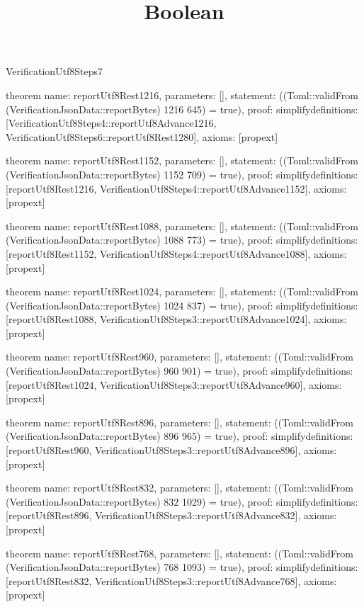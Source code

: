 \begin{lexlean}{VerificationUtf8Steps7}
\title{Boolean}
\begin{semanticmodule}

theorem{
  name: reportUtf8Rest1216,
  parameters: [],
  statement: ((Toml::validFrom (VerificationJsonData::reportBytes) 1216 645) = true),
  proof: simplify{definitions: [VerificationUtf8Steps4::reportUtf8Advance1216, VerificationUtf8Steps6::reportUtf8Rest1280]},
  axioms: [propext]
}

theorem{
  name: reportUtf8Rest1152,
  parameters: [],
  statement: ((Toml::validFrom (VerificationJsonData::reportBytes) 1152 709) = true),
  proof: simplify{definitions: [reportUtf8Rest1216, VerificationUtf8Steps4::reportUtf8Advance1152]},
  axioms: [propext]
}

theorem{
  name: reportUtf8Rest1088,
  parameters: [],
  statement: ((Toml::validFrom (VerificationJsonData::reportBytes) 1088 773) = true),
  proof: simplify{definitions: [reportUtf8Rest1152, VerificationUtf8Steps4::reportUtf8Advance1088]},
  axioms: [propext]
}

theorem{
  name: reportUtf8Rest1024,
  parameters: [],
  statement: ((Toml::validFrom (VerificationJsonData::reportBytes) 1024 837) = true),
  proof: simplify{definitions: [reportUtf8Rest1088, VerificationUtf8Steps3::reportUtf8Advance1024]},
  axioms: [propext]
}

theorem{
  name: reportUtf8Rest960,
  parameters: [],
  statement: ((Toml::validFrom (VerificationJsonData::reportBytes) 960 901) = true),
  proof: simplify{definitions: [reportUtf8Rest1024, VerificationUtf8Steps3::reportUtf8Advance960]},
  axioms: [propext]
}

theorem{
  name: reportUtf8Rest896,
  parameters: [],
  statement: ((Toml::validFrom (VerificationJsonData::reportBytes) 896 965) = true),
  proof: simplify{definitions: [reportUtf8Rest960, VerificationUtf8Steps3::reportUtf8Advance896]},
  axioms: [propext]
}

theorem{
  name: reportUtf8Rest832,
  parameters: [],
  statement: ((Toml::validFrom (VerificationJsonData::reportBytes) 832 1029) = true),
  proof: simplify{definitions: [reportUtf8Rest896, VerificationUtf8Steps3::reportUtf8Advance832]},
  axioms: [propext]
}

theorem{
  name: reportUtf8Rest768,
  parameters: [],
  statement: ((Toml::validFrom (VerificationJsonData::reportBytes) 768 1093) = true),
  proof: simplify{definitions: [reportUtf8Rest832, VerificationUtf8Steps3::reportUtf8Advance768]},
  axioms: [propext]
}

\end{semanticmodule}
\end{lexlean}
